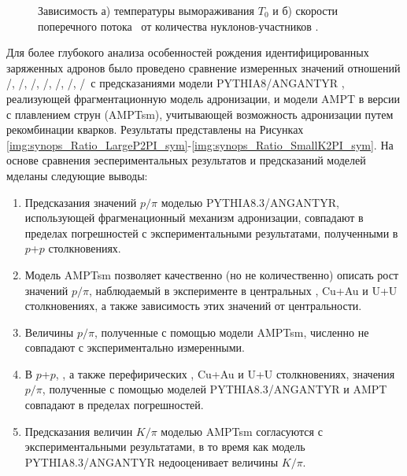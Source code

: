 \begin{figure}[ht]
	\caption{Зависимость а) температуры вымораживания $T_0$ и  б) скорости поперечного потока \ut \ от количества нуклонов-участников \Npart.}\label{fig:synops_T0ut}
\end{figure}
Для более глубокого анализа особенностей рождения идентифицированных заряженных адронов было проведено сравнение измеренных значений отношений  \pim/\pip, \Km/\Kp, \prot/\aprot, \prot/\pip, \aprot/\pim, \Kp/\pip, \Km/\pim \ с предсказаниями модели PYTHIA8/ANGANTYR \cite{pythia}, реализующей фрагментационную модель адронизации, и модели AMPT в версии с плавлением струн (AMPTsm)\cite{AMPT}, учитывающей возможность адронизации путем рекомбинации кварков. 
Результаты представлены на Рисунках \ref{img:synops_Ratio_LargeP2PI_sym}-\ref{img:synops_Ratio_SmallK2PI_sym}.
На основе сравнения эеспериментальных результатов и предсказаний моделей мделаны следующие выводы:

\begin{enumerate}
	\item Предсказания значений $p/\pi$ моделью PYTHIA8.3/ANGANTYR, использующей фрагменационный механизм адронизации, совпадают в пределах погрешностей с экспериментальными результатами, полученными в $p$+$p$ столкновениях. 
	\item Модель AMPTsm позволяет качественно (но не количественно) описать рост значений $p/\pi$, наблюдаемый в эксперименте в центральных \heau, Cu+Au и U+U столкновениях, а также зависимость этих значений от центральности. 
	\item Величины $p/\pi$, полученные с помощью модели AMPTsm, численно не совпадают с экспериментально измеренными. 
	\item В $p$+$p$, \pal, а также перефирических \heau, Cu+Au и U+U столкновениях, значения $p/\pi$, полученные с помощью моделей PYTHIA8.3/ANGANTYR и AMPT совпадают в пределах погрешностей.
	\item Предсказания величин $K/\pi$ моделью AMPTsm согласуются с экспериментальными результатами, в то время как модель PYTHIA8.3/ANGANTYR недооценивает величины $K/\pi$.
\end{enumerate}

